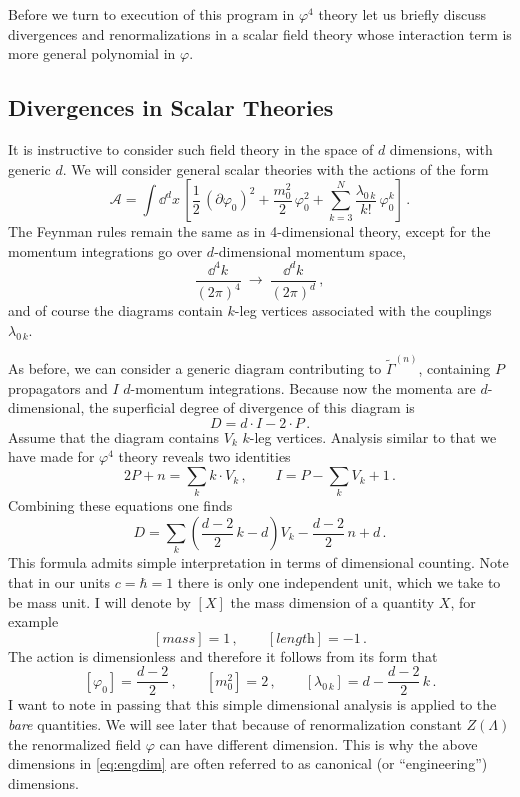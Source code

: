 Before we turn to execution of this program in $\varphi^4$ theory let us briefly
discuss divergences and renormalizations in a scalar field theory whose
interaction term is more general polynomial in $\varphi$.

\subsection*{Divergences in Scalar Theories}

It is instructive to consider such field theory in the space of $d$
dimensions, with generic $d$. We will consider general scalar theories with the
actions of the form
\begin{equation}\label{eq:genscalar}
\mathcal A=\int \dd^dx\,\left[\frac12\,(\partial\varphi_0)^2+\frac{m_0^2}2\,\varphi_0^2+\sum_{k=3}^N\frac{\lambda_{0\,k}}{k!}\,\varphi_0^k\right]\,.
\end{equation}
The Feynman rules remain the same as in 4-dimensional theory, except for the
momentum integrations go over $d$-dimensional momentum space,
\[
\frac{\dd^4k}{(2\pi)^4}\ \to\ \frac{\dd^dk}{(2\pi)^d}\,,
\]
and of course the diagrams contain $k$-leg vertices associated with the
couplings $\lambda_{0\,k}$.

As before, we can consider a generic diagram contributing to
$\tilde\Gamma^{(n)}$, containing $P$ propagators and $I$ $d$-momentum
integrations. Because now the momenta are $d$-dimensional, the superficial
degree of divergence of this diagram is
\[
D=d\cdot I-2\cdot P\,.
\]
Assume that the diagram contains $V_k$ $k$-leg vertices. Analysis similar to
that we have made for $\varphi^4$ theory reveals two identities
\[
2P+n=\sum_kk\cdot V_k\,,\qquad I=P-\sum_kV_k+1\,.
\]
Combining these equations one finds
\[
D=\sum_k\left(\frac{d-2}2\,k-d\right)V_k-\frac{d-2}2\,n+d\,.
\]
This formula admits simple interpretation in terms of dimensional counting.
Note that in our units $c=\hbar=1$ there is only one independent unit, which we
take to be mass unit. I will denote by $[X]$ the mass dimension of a quantity
$X$, for example
\[
[\textit{mass}]=1\,,\qquad[\textit{length}]=-1\,.
\]
The action is dimensionless and therefore it follows from its form that
\begin{equation}\label{eq:engdim}
[\varphi_0]=\frac{d-2}2\,,\qquad[m_0^2]=2\,,\qquad[\lambda_{0\,k}]=d-\frac{d-2}2\,k\,.
\end{equation}
I want to note in passing that this simple dimensional analysis is applied to
the \emph{bare} quantities. We will see later that because of renormalization
constant $Z(\Lambda)$ the renormalized field $\varphi$ can have different
dimension. This is why the above dimensions in \eqref{eq:engdim} are often
referred to as canonical (or ``engineering'') dimensions.

